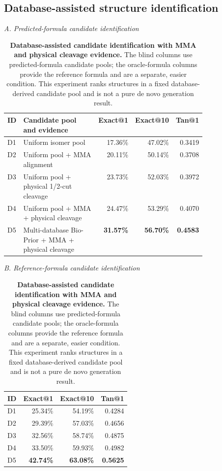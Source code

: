 \subsection{Database-assisted structure identification}

\begin{table}[!htbp]
\centering
\caption{\textbf{Database-assisted candidate identification with MMA and physical cleavage evidence.}
The blind columns use predicted-formula candidate pools; the oracle-formula columns
provide the reference formula and are a separate, easier condition. This experiment
ranks structures in a fixed database-derived candidate pool and is not a pure
de novo generation result.}
\label{tab:bio_prior_mma_cleavage}
\small
\setlength{\tabcolsep}{3.5pt}
\renewcommand{\arraystretch}{1.10}
\noindent\textit{A. Predicted-formula candidate identification}\par\vspace{3pt}
\begin{tabular}{@{}lp{0.47\linewidth}rrr@{}}
\toprule
ID & Candidate pool and evidence & Exact@1 & Exact@10 & Tan@1 \\
\midrule
D1 & Uniform isomer pool & 17.36\% & 47.02\% & 0.3419 \\
D2 & Uniform pool + MMA alignment & 20.11\% & 50.14\% & 0.3708 \\
D3 & Uniform pool + physical 1/2-cut cleavage & 23.73\% & 52.03\% & 0.3972 \\
D4 & Uniform pool + MMA + physical cleavage & 24.47\% & 53.29\% & 0.4070 \\
D5 & Multi-database Bio-Prior + MMA + physical cleavage & \textbf{31.57\%} & \textbf{56.70\%} & \textbf{0.4583} \\
\bottomrule
\end{tabular}
\par\vspace{8pt}
\noindent\textit{B. Reference-formula candidate identification}\par\vspace{3pt}
\begin{tabular}{@{}lrrr@{}}
\toprule
ID & Exact@1 & Exact@10 & Tan@1 \\
\midrule
D1 & 25.34\% & 54.19\% & 0.4284 \\
D2 & 29.39\% & 57.03\% & 0.4656 \\
D3 & 32.56\% & 58.74\% & 0.4875 \\
D4 & 33.50\% & 59.93\% & 0.4982 \\
D5 & \textbf{42.74\%} & \textbf{63.08\%} & \textbf{0.5625} \\
\bottomrule
\end{tabular}
\end{table}

